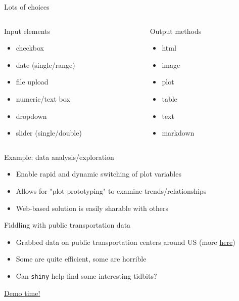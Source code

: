 \documentclass[sans,aspectratio=169,presentation,bigger,fleqn]{beamer}
\begin{document}
\begin{frame}[label=sec-9]{Lots of choices}
\begin{columns}
\begin{column}{0.45\columnwidth}
\begin{block}{Input elements}
\begin{itemize}
\item checkbox
\item date (single/range)
\item file upload
\item numeric/text box
\item dropdown
\item slider (single/double)
\end{itemize}
\end{block}
\end{column}

\begin{column}{0.45\columnwidth}
\begin{block}{Output methods}
\begin{itemize}
\item html
\item image
\item plot
\item table
\item text
\item\relax [rendered] markdown
\end{itemize}
\end{block}
\end{column}
\end{columns}
\end{frame}

\begin{frame}[label=sec-10]{Example: data analysis/exploration}
\begin{itemize}
\item Enable rapid and dynamic switching of plot variables
\item Allows for "plot prototyping" to examine trends/relationships
\item Web-based solution is easily sharable with others
\end{itemize}
\end{frame}

\begin{frame}[fragile,label=sec-11]{Fiddling with public transportation data}
 \begin{itemize}
\item Grabbed data on public transportation centers around US (more \href{https://github.com/tcrug/public-transpo}{here})
\item Some are quite efficient, some are horrible
\item Can \texttt{shiny} help find some interesting tidbits?
\end{itemize}

\pause

\href{https://jwhendy.shinyapps.io/transpo-exploration/}{\alert{Demo time!}}
\end{frame}
\end{document}
